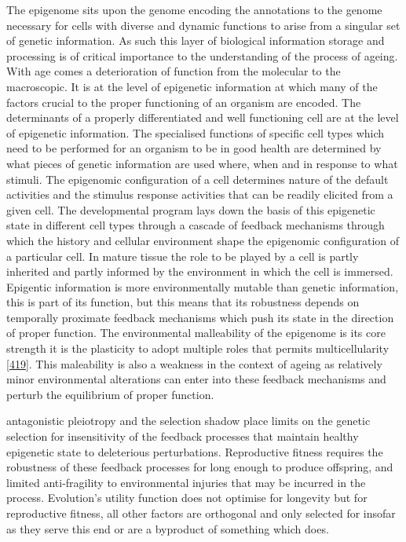 \documentclass[
]{book}
\begin{document}
The epigenome sits upon the genome encoding the annotations to the genome necessary for cells with diverse and dynamic functions to arise from a singular set of genetic information.
As such this layer of biological information storage and processing is of critical importance to the understanding of the process of ageing.
With age comes a deterioration of function from the molecular to the macroscopic.
It is at the level of epigenetic information at which many of the factors crucial to the proper functioning of an organism are encoded.
The determinants of a properly differentiated and well functioning cell are at the level of epigenetic information.
The specialised functions of specific cell types which need to be performed for an organism to be in good health are determined by what pieces of genetic information are used where, when and in response to what stimuli.
The epigenomic configuration of a cell determines nature of the default activities and the stimulus response activities that can be readily elicited from a given cell.
The developmental program lays down the basis of this epigenetic state in different cell types through a cascade of feedback mechanisms through which the history and cellular environment shape the epigenomic configuration of a particular cell.
In mature tissue the role to be played by a cell is partly inherited and partly informed by the environment in which the cell is immersed.
Epigentic information is more environmentally mutable than genetic information, this is part of its function, but this means that its robustness depends on temporally proximate feedback mechanisms which push its state in the direction of proper function.
The environmental malleability of the epigenome is its core strength it is the plasticity to adopt multiple roles that permits multicellularity {[}\protect\hyperlink{ref-Tudge2016}{419}{]}.
This maleability is also a weakness in the context of ageing as relatively minor environmental alterations can enter into these feedback mechanisms and perturb the equilibrium of proper function.

antagonistic pleiotropy and the selection shadow place limits on the genetic selection for insensitivity of the feedback processes that maintain healthy epigenetic state to deleterious perturbations.
Reproductive fitness requires the robustness of these feedback processes for long enough to produce offspring, and limited anti-fragility to environmental injuries that may be incurred in the process.
Evolution's utility function does not optimise for longevity but for reproductive fitness, all other factors are orthogonal and only selected for insofar as they serve this end or are a byproduct of something which does.
\end{document}
